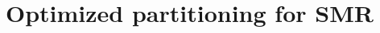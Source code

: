 \chapter[Optimized partitioning for SMR]{Optimized partitioning for SMR}
\label{sec:dynastar}









